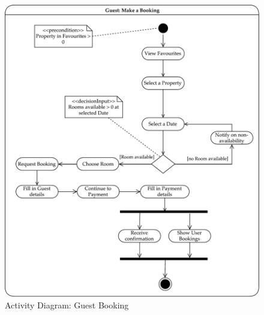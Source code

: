 \begin{figure}[H]
    \centering
    \includegraphics[width=17cm]{img/activity/make_booking.pdf}
    \caption{Activity Diagram: Guest Booking}
    \label{activity_diagram_2}
\end{figure}

